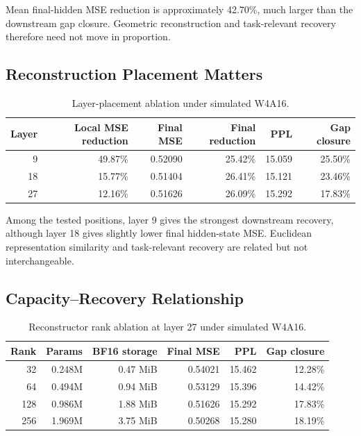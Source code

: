 \documentclass[11pt]{article}
\begin{document}
Mean final-hidden MSE reduction is approximately 42.70\%, much larger than the downstream gap closure. Geometric reconstruction and task-relevant recovery therefore need not move in proportion.

\subsection{Reconstruction Placement Matters}

\begin{table}[t]
\centering
\small
\begin{tabular}{rrrrrr}
\toprule
Layer & Local MSE reduction & Final MSE & Final reduction & PPL & Gap closure \\
\midrule
9 & 49.87\% & 0.52090 & 25.42\% & 15.059 & 25.50\% \\
18 & 15.77\% & 0.51404 & 26.41\% & 15.121 & 23.46\% \\
27 & 12.16\% & 0.51626 & 26.09\% & 15.292 & 17.83\% \\
\bottomrule
\end{tabular}
\caption{Layer-placement ablation under simulated W4A16.}
\label{tab:layers}
\end{table}

Among the tested positions, layer 9 gives the strongest downstream recovery, although layer 18 gives slightly lower final hidden-state MSE. Euclidean representation similarity and task-relevant recovery are related but not interchangeable.

\subsection{Capacity--Recovery Relationship}

\begin{table}[t]
\centering
\small
\begin{tabular}{rrrrrr}
\toprule
Rank & Params & BF16 storage & Final MSE & PPL & Gap closure \\
\midrule
32 & 0.248M & 0.47 MiB & 0.54021 & 15.462 & 12.28\% \\
64 & 0.494M & 0.94 MiB & 0.53129 & 15.396 & 14.42\% \\
128 & 0.986M & 1.88 MiB & 0.51626 & 15.292 & 17.83\% \\
256 & 1.969M & 3.75 MiB & 0.50268 & 15.280 & 18.19\% \\
\bottomrule
\end{tabular}
\caption{Reconstructor rank ablation at layer 27 under simulated W4A16.}
\label{tab:ranks}
\end{table}
\end{document}
